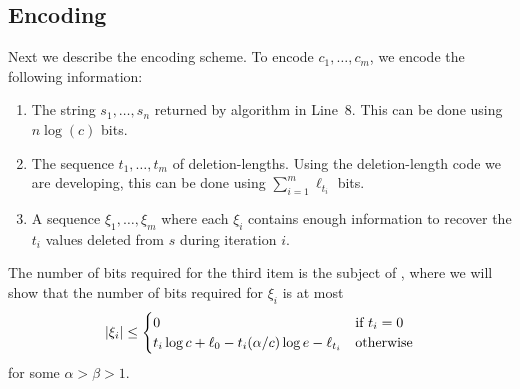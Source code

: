 \documentclass{patmorin}
\begin{document}

\subsection{Encoding}

Next we describe the encoding scheme.  To encode $c_1,\ldots,c_m$, we encode the following information:
\begin{enumerate}
  \item The string $s_1,\ldots,s_n$ returned by algorithm in Line~8. This can be done using $n\log(c)$ bits.
  \item The sequence $t_1,\ldots,t_m$ of deletion-lengths. Using the deletion-length code we are developing, this can be done using $\sum_{i=1}^m \ell_{t_i}$ bits.
  \item A sequence $\xi_1,\ldots,\xi_m$ where each $\xi_i$ contains enough information to recover the $t_i$ values deleted from $s$ during iteration $i$.
\end{enumerate}

The number of bits required for the third item is the subject of , where we will show that the number of bits required for $\xi_i$ is at most
\begin{equation}
   |\xi_i| 
   \le \begin{cases}
     0 & \text{if $t_i = 0$} \\
     t_i\log c + \ell_0 - t_i(\alpha/c)\log e - \ell_{t_i}
        & \text{otherwise} \\
   \end{cases}  \eqlabel{xi-i}
\end{equation}
for some $\alpha > \beta > 1$.
\end{document}
